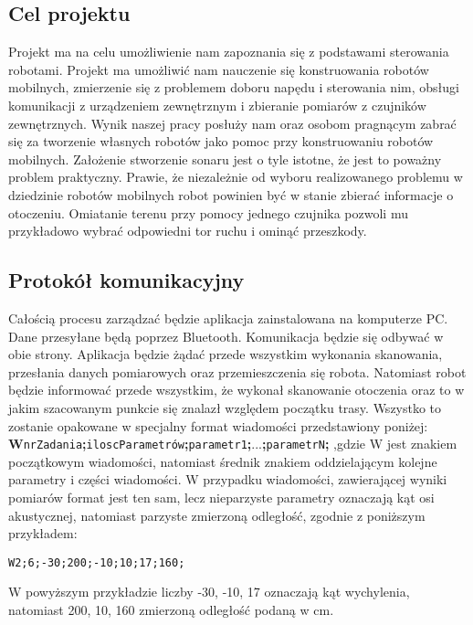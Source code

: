 \subsection{Cel projektu}
Projekt ma na celu umożliwienie nam zapoznania się z podstawami sterowania robotami. Projekt ma umożliwić nam nauczenie się konstruowania robotów mobilnych, zmierzenie się z problemem doboru napędu i sterowania nim, obsługi komunikacji z urządzeniem zewnętrznym i zbieranie pomiarów z czujników zewnętrznych. Wynik naszej pracy posłuży nam oraz osobom pragnącym zabrać się za tworzenie własnych robotów jako pomoc przy konstruowaniu robotów mobilnych. \newline
Założenie stworzenie sonaru jest o tyle istotne, że jest to poważny problem praktyczny. Prawie, że niezależnie od wyboru realizowanego problemu w dziedzinie robotów mobilnych robot powinien być w stanie zbierać informacje o otoczeniu. Omiatanie terenu przy pomocy jednego czujnika pozwoli mu przykładowo wybrać odpowiedni tor ruchu i ominąć przeszkody.
\subsection{Protokół komunikacyjny}
Całością procesu zarządzać będzie aplikacja zainstalowana na komputerze PC. Dane przesyłane będą poprzez Bluetooth. Komunikacja będzie się odbywać w obie strony. Aplikacja będzie żądać przede wszystkim wykonania skanowania, przesłania danych pomiarowych oraz przemieszczenia się robota. Natomiast robot będzie informować przede wszystkim, że wykonał skanowanie otoczenia oraz to w jakim szacowanym punkcie się znalazł względem początku trasy. Wszystko to zostanie opakowane w specjalny format wiadomości przedstawiony poniżej:
\newline
\textbf{W}\verb+nrZadania+\textbf{;}\verb+iloscParametrów+\textbf{;}\verb+parametr1+\textbf{;}...\textbf{;}\verb+parametrN+\textbf{;}
\newline
,gdzie W jest znakiem początkowym wiadomości, natomiast średnik znakiem oddzielającym kolejne parametry i części wiadomości.
\newline
W przypadku wiadomości, zawierającej wyniki pomiarów format jest ten sam, lecz nieparzyste parametry oznaczają kąt osi akustycznej, natomiast parzyste zmierzoną odległość, zgodnie z poniższym przykładem:\newline
\begin{verbatim}
W2;6;-30;200;-10;10;17;160;
\end{verbatim}
W powyższym przykładzie liczby -30, -10, 17 oznaczają kąt wychylenia, natomiast 200, 10, 160 zmierzoną odległość podaną w cm. 


